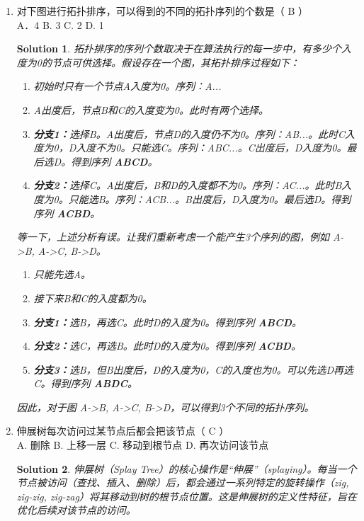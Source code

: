 \documentclass[UTF8]{report}
\newtheorem{solution}{Solution}
\theoremstyle{MyLineTheoremStyle} %
\theoremstyle{MyBlockTheoremStyle} %
\theoremstyle{MySubsubsectionStyle} %
\begin{document}
\begin{enumerate}
    \item 对下图进行拓扑排序，可以得到的不同的拓扑序列的个数是（ B ）\\
    A．4 \quad B. 3 \quad C. 2 \quad D. 1
    \begin{solution}
        拓扑排序的序列个数取决于在算法执行的每一步中，有多少个入度为0的节点可供选择。假设存在一个图，其拓扑排序过程如下：
        \begin{enumerate}
            \item 初始时只有一个节点A入度为0。序列：A...
            \item A出度后，节点B和C的入度变为0。此时有两个选择。
            \item \textbf{分支1：}选择B。A出度后，节点D的入度仍不为0。序列：AB...。此时C入度为0，D入度不为0。只能选C。序列：ABC...。C出度后，D入度为0。最后选D。得到序列 \textbf{ABCD}。
            \item \textbf{分支2：}选择C。A出度后，B和D的入度都不为0。序列：AC...。此时B入度为0。只能选B。序列：ACB...。B出度后，D入度为0。最后选D。得到序列 \textbf{ACBD}。
        \end{enumerate}
        等一下，上述分析有误。让我们重新考虑一个能产生3个序列的图，例如 A->B, A->C, B->D。
        \begin{enumerate}
            \item 只能先选A。
            \item 接下来B和C的入度都为0。
            \item \textbf{分支1：}选B，再选C。此时D的入度为0。得到序列 \textbf{ABCD}。
            \item \textbf{分支2：}选C，再选B。此时D的入度为0。得到序列 \textbf{ACBD}。
            \item \textbf{分支3：}选B，但B出度后，D的入度为0，C的入度也为0。可以先选D再选C。得到序列 \textbf{ABDC}。
        \end{enumerate}
        因此，对于图 A->B, A->C, B->D，可以得到3个不同的拓扑序列。
    \end{solution}

    \item 伸展树每次访问过某节点后都会把该节点（ C ）\\
    A. 删除 \quad B. 上移一层 \quad C. 移动到根节点 \quad D. 再次访问该节点
    \begin{solution}
        伸展树（Splay Tree）的核心操作是“伸展”（splaying）。每当一个节点被访问（查找、插入、删除）后，都会通过一系列特定的旋转操作（zig, zig-zig, zig-zag）将其移动到树的根节点位置。这是伸展树的定义性特征，旨在优化后续对该节点的访问。
    \end{solution}


\end{enumerate}
\end{document}
